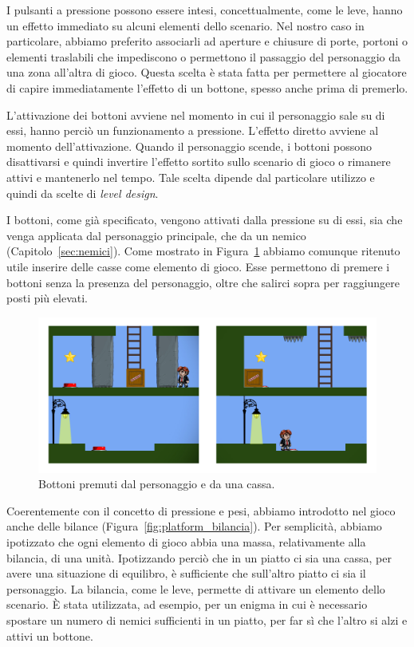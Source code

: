 I pulsanti a pressione possono essere intesi, concettualmente, come le leve, hanno un effetto immediato su alcuni elementi dello scenario. Nel nostro caso in particolare, abbiamo preferito associarli ad aperture e chiusure di porte, portoni o elementi traslabili che impediscono o permettono il passaggio del personaggio da una zona all’altra di gioco. Questa scelta è stata fatta per permettere al giocatore di capire immediatamente l’effetto di un bottone, spesso anche prima di premerlo.

L’attivazione dei bottoni avviene nel momento in cui il personaggio sale su di essi, hanno perciò un funzionamento a pressione. L’effetto diretto avviene al momento dell’attivazione. Quando il personaggio scende, i bottoni possono disattivarsi e quindi invertire l’effetto sortito sullo scenario di gioco o rimanere attivi e mantenerlo nel tempo. Tale scelta dipende dal particolare utilizzo e quindi da scelte di \textit{level design}.

I bottoni, come già specificato, vengono attivati dalla pressione su di essi, sia che venga applicata dal personaggio principale, che da un nemico (Capitolo~\ref{sec:nemici}). Come mostrato in Figura~\ref{fig:platform_bottoni} abbiamo comunque ritenuto utile inserire delle casse come elemento di gioco. Esse permettono di premere i bottoni senza la presenza del personaggio, oltre che salirci sopra per raggiungere posti più elevati.

\begin{figure}%
	\centering
	\includegraphics[width= \columnwidth]{images/gameDesign/10.jpg}
	\caption{Bottoni premuti dal personaggio e da una cassa.}
	\label{fig:platform_bottoni}
\end{figure}

Coerentemente con il concetto di pressione e pesi, abbiamo introdotto nel gioco anche delle bilance (Figura~\ref{fig:platform_bilancia}). Per semplicità, abbiamo ipotizzato che ogni elemento di gioco abbia una massa, relativamente alla bilancia, di una unità. Ipotizzando perciò che in un piatto ci sia una cassa, per avere una situazione di equilibro, è sufficiente che sull’altro piatto ci sia il personaggio. La bilancia, come le leve, permette di attivare un elemento dello scenario. È stata utilizzata, ad esempio, per un enigma in cui è necessario spostare un numero di nemici sufficienti in un piatto, per far sì che l’altro si alzi e attivi un bottone.

